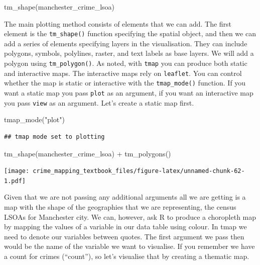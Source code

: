 \documentclass[
]{book}
\newenvironment{Shaded}{\begin{snugshade}}{\end{snugshade}}
\newcommand{\FunctionTok}[1]{\textcolor[rgb]{0.00,0.00,0.00}{#1}}
\newcommand{\NormalTok}[1]{#1}
\newcommand{\SpecialCharTok}[1]{\textcolor[rgb]{0.00,0.00,0.00}{#1}}
\newcommand{\StringTok}[1]{\textcolor[rgb]{0.31,0.60,0.02}{#1}}
\begin{document}
\begin{Shaded}
\begin{Highlighting}[]
\FunctionTok{tm\_shape}\NormalTok{(manchester\_crime\_lsoa)}
\end{Highlighting}
\end{Shaded}

The main plotting method consists of elements that we can add. The first element is the \texttt{tm\_shape()} function specifying the spatial object, and then we can add a series of elements specifying layers in the visualisation. They can include polygons, symbols, polylines, raster, and text labels as base layers. We will add a polygon using \texttt{tm\_polygon()}. As noted, with \texttt{tmap} you can produce both static and interactive maps. The interactive maps rely on \texttt{leaflet}. You can control whether the map is static or interactive with the \texttt{tmap\_mode()} function. If you want a static map you pass \texttt{plot} as an argument, if you want an interactive map you pass \texttt{view} as an argument. Let's create a static map first.

\begin{Shaded}
\begin{Highlighting}[]
\FunctionTok{tmap\_mode}\NormalTok{(}\StringTok{"plot"}\NormalTok{)}
\end{Highlighting}
\end{Shaded}

\begin{verbatim}
## tmap mode set to plotting
\end{verbatim}

\begin{Shaded}
\begin{Highlighting}[]
\FunctionTok{tm\_shape}\NormalTok{(manchester\_crime\_lsoa) }\SpecialCharTok{+} 
  \FunctionTok{tm\_polygons}\NormalTok{()}
\end{Highlighting}
\end{Shaded}

\texttt{[image: crime\_mapping\_textbook\_files/figure-latex/unnamed-chunk-62-1.pdf]}

Given that we are not passing any additional arguments all we are getting is a map with the shape of the geographies that we are representing, the census LSOAs for Manchester city. We can, however, ask R to produce a choropleth map by mapping the values of a variable in our data table using colour. In tmap we need to denote our variables between quotes. The first argument we pass then would be the name of the variable we want to visualise. If you remember we have a count for crimes (``count''), so let's visualise that by creating a thematic map.
\end{document}
